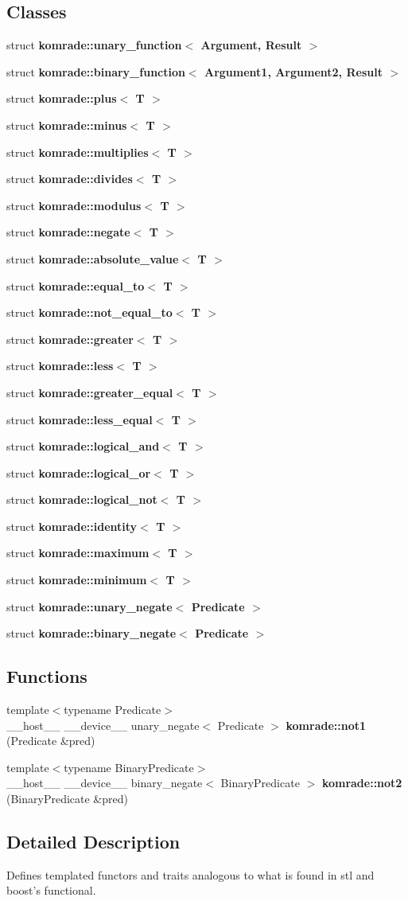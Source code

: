 \subsection*{Classes}
\begin{CompactItemize}
\item 
struct {\bf komrade::unary\_\-function$<$ Argument, Result $>$}
\item 
struct {\bf komrade::binary\_\-function$<$ Argument1, Argument2, Result $>$}
\item 
struct {\bf komrade::plus$<$ T $>$}
\item 
struct {\bf komrade::minus$<$ T $>$}
\item 
struct {\bf komrade::multiplies$<$ T $>$}
\item 
struct {\bf komrade::divides$<$ T $>$}
\item 
struct {\bf komrade::modulus$<$ T $>$}
\item 
struct {\bf komrade::negate$<$ T $>$}
\item 
struct {\bf komrade::absolute\_\-value$<$ T $>$}
\item 
struct {\bf komrade::equal\_\-to$<$ T $>$}
\item 
struct {\bf komrade::not\_\-equal\_\-to$<$ T $>$}
\item 
struct {\bf komrade::greater$<$ T $>$}
\item 
struct {\bf komrade::less$<$ T $>$}
\item 
struct {\bf komrade::greater\_\-equal$<$ T $>$}
\item 
struct {\bf komrade::less\_\-equal$<$ T $>$}
\item 
struct {\bf komrade::logical\_\-and$<$ T $>$}
\item 
struct {\bf komrade::logical\_\-or$<$ T $>$}
\item 
struct {\bf komrade::logical\_\-not$<$ T $>$}
\item 
struct {\bf komrade::identity$<$ T $>$}
\item 
struct {\bf komrade::maximum$<$ T $>$}
\item 
struct {\bf komrade::minimum$<$ T $>$}
\item 
struct {\bf komrade::unary\_\-negate$<$ Predicate $>$}
\item 
struct {\bf komrade::binary\_\-negate$<$ Predicate $>$}
\end{CompactItemize}
\subsection*{Functions}
\begin{CompactItemize}
\item 
{\footnotesize template$<$typename Predicate$>$ }\\\_\-\_\-host\_\-\_\- \_\-\_\-device\_\-\_\- unary\_\-negate$<$ Predicate $>$ {\bf komrade::not1} (Predicate \&pred)
\item 
{\footnotesize template$<$typename BinaryPredicate$>$ }\\\_\-\_\-host\_\-\_\- \_\-\_\-device\_\-\_\- binary\_\-negate$<$ BinaryPredicate $>$ {\bf komrade::not2} (BinaryPredicate \&pred)
\end{CompactItemize}


\subsection{Detailed Description}
Defines templated functors and traits analogous to what is found in stl and boost's functional. 

